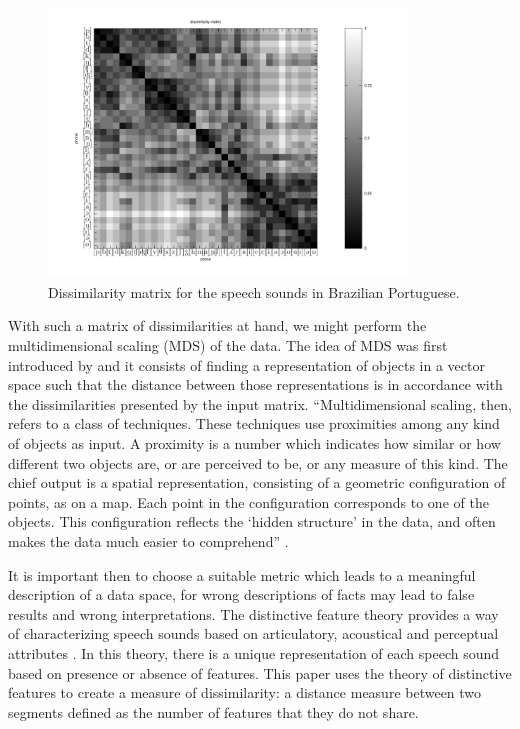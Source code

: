 \begin{figure}[h!]
\centering
\includegraphics[width=0.85\textwidth]{images/dissimilarity_PT_matrix.pdf}
\caption{Dissimilarity matrix for the speech sounds in Brazilian Portuguese.}
\label{fig:dissimilaritymatrix}
\end{figure}

With such a matrix of dissimilarities at hand, we might perform the multidimensional scaling (MDS) of the data. The idea of MDS was first introduced by \citet{young} and it consists of finding a representation of objects in a vector space such that the distance between those representations is in accordance with the dissimilarities presented by the input matrix. 
``Multidimensional scaling, then, refers to a class of techniques. These techniques use proximities among any kind of objects as input. A proximity is a number which indicates how similar or how different two objects are, or are perceived to be, or any measure of this kind. The chief output is a spatial representation, consisting of a geometric configuration of points, as on a map. Each point in the configuration corresponds to one of the objects. This configuration reflects the `hidden structure' in the data, and often makes the data much easier to comprehend'' \citep{kruskal}.

It is important then to choose a suitable metric which leads to a meaningful description of a data space, for wrong descriptions of facts may lead to false results and wrong interpretations. The distinctive feature theory provides a way of characterizing speech sounds based on articulatory, acoustical and perceptual attributes \citep{chomsky1968a}. In this theory, there is a unique representation of each speech sound based on presence or absence of features. This paper uses the theory of distinctive features to create a measure of dissimilarity: a distance measure between two segments defined as the number of features that they do not share.


